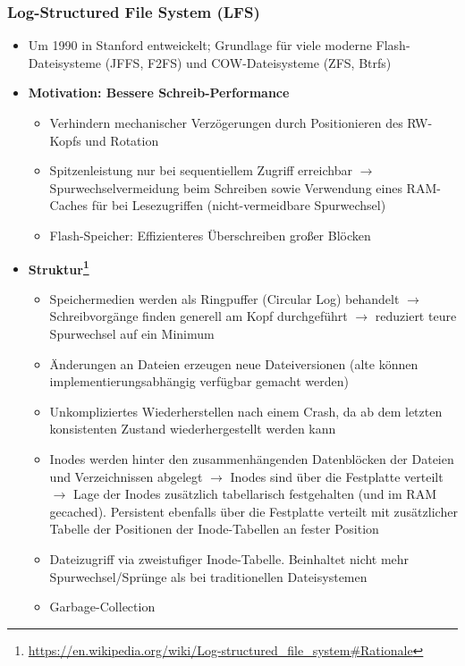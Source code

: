 \subsubsection{Log-Structured File System (LFS)}
\begin{itemize}
	\item Um 1990 in Stanford entweickelt; Grundlage für viele moderne Flash-Dateisysteme (JFFS, F2FS) und COW-Dateisysteme (ZFS, Btrfs)
	\item \textbf{Motivation: Bessere Schreib-Performance}
	\begin{itemize}
		\item Verhindern mechanischer Verzögerungen durch Positionieren des RW-Kopfs und Rotation
		\item Spitzenleistung nur bei sequentiellem Zugriff erreichbar \(\rightarrow\) Spurwechselvermeidung beim Schreiben sowie Verwendung eines RAM-Caches für bei Lesezugriffen (nicht-vermeidbare Spurwechsel)
		\item Flash-Speicher: Effizienteres Überschreiben großer Blöcken
	\end{itemize}
	\item \textbf{Struktur\footnote{\url{https://en.wikipedia.org/wiki/Log-structured_file_system\#Rationale}}}
	\begin{itemize}
		\item Speichermedien werden als Ringpuffer (Circular Log) behandelt \(\rightarrow\) Schreibvorgänge finden generell am Kopf durchgeführt \(\rightarrow\) reduziert teure Spurwechsel auf ein Minimum
		\item Änderungen an Dateien erzeugen neue Dateiversionen (alte können implementierungsabhängig verfügbar gemacht werden)
		\item Unkompliziertes Wiederherstellen nach einem Crash, da ab dem letzten konsistenten Zustand wiederhergestellt werden kann
		\item Inodes werden hinter den zusammenhängenden Datenblöcken der Dateien und Verzeichnissen abgelegt \(\rightarrow\) Inodes sind über die Festplatte verteilt \(\rightarrow\) Lage der Inodes zusätzlich tabellarisch festgehalten (und im RAM gecached). Persistent ebenfalls über die Festplatte verteilt mit zusätzlicher Tabelle der Positionen der Inode-Tabellen an fester Position
		\item Dateizugriff via zweistufiger Inode-Tabelle. Beinhaltet nicht mehr Spurwechsel/Sprünge als bei traditionellen Dateisystemen
		\item Garbage-Collection
		\begin{itemize}

\end{itemize}
\end{itemize}
\end{itemize}
